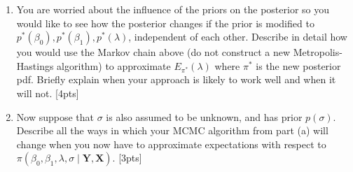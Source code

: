 \documentclass[12pt]{article}
\begin{document}
\begin{enumerate}
\begin{enumerate}
\item You are worried about the influence of the priors on the
  posterior so you would like to see how the posterior changes if the
  prior is modified to $p^*(\beta_0), p^*(\beta_1), p^*(\lambda)$,
  independent of each other. Describe in detail how you would use the
  Markov chain above (do not construct a new Metropolis-Hastings
  algorithm) to approximate $E_{\pi^*}(\lambda)$ where $\pi^*$ is the
  new posterior pdf. Briefly explain when your approach is likely to
  work well and when it will not. [4pts]
\item Now suppose that $\sigma$ is also assumed to be unknown, and has
  prior $p(\sigma)$. Describe all the ways in which your MCMC
  algorithm from part (a) will change when you now have to approximate expectations
  with respect to $\pi(\beta_0, \beta_1, \lambda, \sigma \mid  {\mathbf Y}, {\mathbf X})$. [3pts]
\newpage
\phantom{boo}
\newpage
\phantom{boo}
\end{enumerate}
\end{enumerate}
\end{document}
